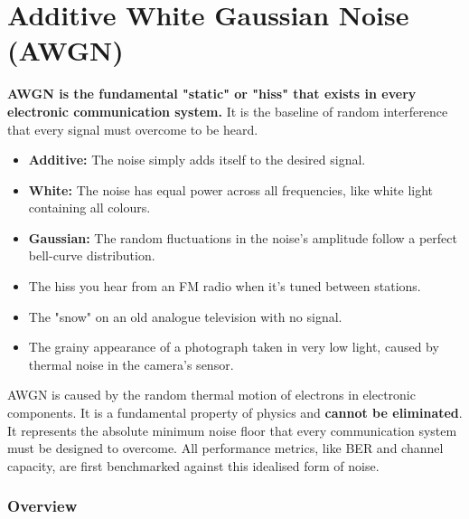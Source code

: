 
\chapter{Additive White Gaussian Noise (AWGN)}
\label{ch:awgn}

\begin{nontechnical}
    \textbf{AWGN is the fundamental "static" or "hiss" that exists in every electronic communication system.} It is the baseline of random interference that every signal must overcome to be heard.

    \begin{itemize}
        \item \textbf{Additive:} The noise simply adds itself to the desired signal.
        \item \textbf{White:} The noise has equal power across all frequencies, like white light containing all colours.
        \item \textbf{Gaussian:} The random fluctuations in the noise's amplitude follow a perfect bell-curve distribution.
    \end{itemize}

    \begin{itemize}
        \item The hiss you hear from an FM radio when it's tuned between stations.
        \item The "snow" on an old analogue television with no signal.
        \item The grainy appearance of a photograph taken in very low light, caused by thermal noise in the camera's sensor.
    \end{itemize}

     AWGN is caused by the random thermal motion of electrons in electronic components. It is a fundamental property of physics and \textbf{cannot be eliminated}. It represents the absolute minimum noise floor that every communication system must be designed to overcome. All performance metrics, like BER and channel capacity, are first benchmarked against this idealised form of noise.
\end{nontechnical}


\subsection{Overview}

